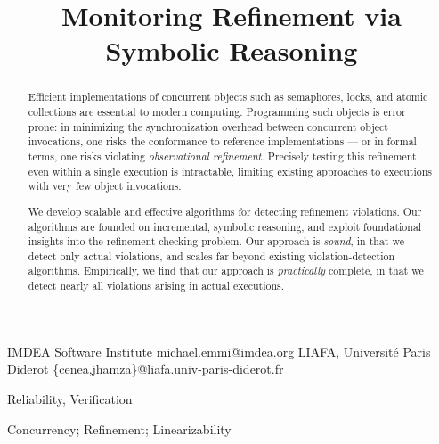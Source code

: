 \documentclass{sigplanconf}
\begin{document}
  \setlength{\pdfpageheight}{\paperheight}
  \setlength{\pdfpagewidth}{\paperwidth}


  \title{Monitoring Refinement via Symbolic Reasoning}

    {IMDEA Software Institute}
    {michael.emmi@imdea.org}
    {LIAFA, Université Paris Diderot}
    {\{cenea,jhamza\}@liafa.univ-paris-diderot.fr}

  \maketitle

  \begin{abstract}

    Efficient implementations of concurrent objects such as semaphores, locks,
    and atomic collections are essential to modern computing. Programming such
    objects is error prone: in minimizing the synchronization overhead between
    concurrent object invocations, one risks the conformance to reference
    implementations --- or in formal terms, one risks violating
    \emph{observational refinement}. Precisely testing this refinement even
    within a single execution is intractable, limiting existing approaches to
    executions with very few object invocations.

    We develop scalable and effective algorithms for detecting refinement
    violations. Our algorithms are founded on incremental, symbolic reasoning,
    and exploit foundational insights into the refinement-checking problem. Our
    approach is \emph{sound}, in that we detect only actual violations, and
    scales far beyond existing violation-detection algorithms. Empirically, we
    find that our approach is \emph{practically} complete, in that we detect
    nearly all violations arising in actual executions.

  \end{abstract}
  

  \terms
  Reliability, Verification

  \keywords
  Concurrency; Refinement; Linearizability

  
  
  
  
  
  
  
  
  
  
\end{document}
